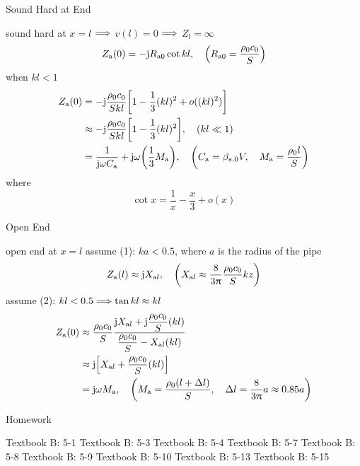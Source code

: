 \documentclass[9pt,mathserif]{beamer}
\begin{document}
\begin{frame}{Sound Hard at End}
	\begin{outline}
		\1 sound hard at $x=l$ $\Longrightarrow$ $v(l) =0$ $\Longrightarrow$ $Z_l =\infty$
		$$
		Z\st{a}(0) = -\mj R\st{a0}\cot kl\qc \qty(R\st{a0}=\frac{\rho_0c_0}{
		S})$$
		\1 when $kl<1$
		\begin{align*}
			Z\st{a}(0) &= -\mj \frac{\rho_0c_0}{Skl} \qty[1-
			\frac13 (kl)^2+o((kl)^2)]\\
			&\approx -\mj \frac{\rho_0c_0}{Skl} \qty[1-\frac13
			(kl)^2]\qc (kl\ll 1)\\
			&= \frac{1}{\mj \omega C\st{a}}+\mj \omega\qty(\frac13 M\st{a})
			\qc \qty(C\st{a} = \beta_{s,0} V\qc M\st{a}=\frac{\rho_0 l}{S})
		\end{align*}
		\1 where
		$$
		\cot x = \frac1x - \frac{x}{3} + o(x)
		$$
	\end{outline}
\end{frame}

\begin{frame}{Open End}
	\begin{outline}
		\1 open end at $x=l$
		\1 assume (1): $ka<0.5$, where $a$ is the radius of
		the pipe
		$$Z\st{a}(l) \approx \mj X_{\mathrm{a}l}\qc
		\qty(X_{\mathrm{a}l} \approx \frac{8}{3\uppi} \frac{\rho_0c_0}{S}
		kz)$$
		\1 assume (2): $kl<0.5 \Longrightarrow \tan kl \approx kl$
		\begin{align*}
		Z\st{a}(0) &\approx \frac{\rho_0c_0}{S} \frac{
			\mj X_{\mathrm{a}l}+\mj \dfrac{\rho_0c_0}{S} (kl)}{
				\dfrac{\rho_0c_0}{S}-X_{\mathrm{a}l} (kl)}\\
				&\approx \mj  \qty[X_{\mathrm{a}l} + \dfrac{\rho_0
				c_0}{S} (kl)]\\
				& = \mj \omega M\st{a} \qc \qty(
				M\st{a} = \frac{\rho_0(l+\Delta l)}{S}\qc
				\Delta l=\frac{8}{3\uppi}a \approx 0.85 a)
		\end{align*}
	\end{outline}
\end{frame}

\begin{frame}{Homework}
	\begin{outline}[enumerate]
		\1 Textbook B: 5-1
		\1 Textbook B: 5-3
		\1 Textbook B: 5-4
		\1 Textbook B: 5-7
		\1 Textbook B: 5-8
		\1 Textbook B: 5-9
		\1 Textbook B: 5-10
		\1 Textbook B: 5-13
		\1 Textbook B: 5-15
	\end{outline}
\end{frame}
\end{document}
